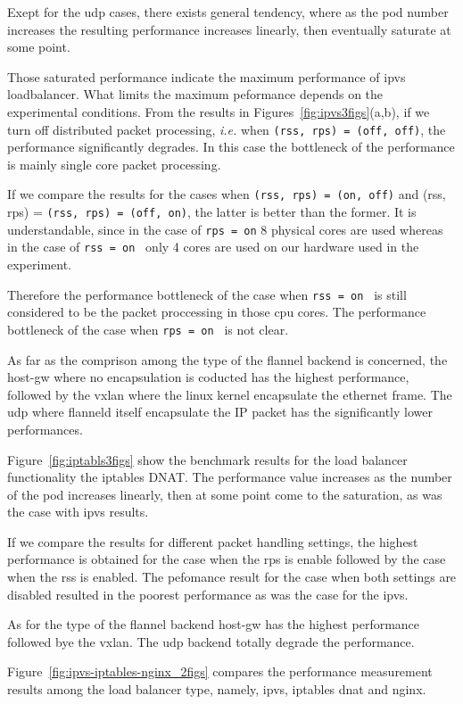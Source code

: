Exept for the udp cases, there exists general tendency, 
where as the pod number increases the resulting performance increases linearly, 
then eventually saturate at some point.

Those saturated performance indicate the maximum performance of ipvs loadbalancer.
What limits the maximum peformance depends on the experimental conditions.
From the results in Figures~\ref{fig:ipvs3figs}(a,b), if we turn off distributed packet processing,
{\it i.e.} when {\tt (rss, rps) = (off, off)}, the performance significantly degrades. 
In this case the bottleneck of the performance is mainly single core packet processing.

If we compare the results for the cases when {\tt (rss, rps) = (on, off)} and (rss, rps) = {\tt (rss, rps) = (off, on)},
the latter is better than the former.
It is understandable, since in the case of {\tt rps = on} 8 physical cores are used whereas 
in the case of {\tt rss = on } only 4 cores are used on our hardware used in the experiment.

Therefore the performance bottleneck of the case when {\tt rss = on } is still 
considered to be the packet proccessing in those cpu cores.
The performance bottleneck of the case when {\tt rps = on } is not clear.

As far as the comprison among the type of the flannel backend is concerned, 
the host-gw where no encapsulation is coducted has the highest performance,
followed by the vxlan where the linux kernel encapsulate the ethernet frame.
The udp where flanneld itself encapsulate the IP packet has the significantly lower performances.

Figure~\ref{fig:iptabls3figs} show the benchmark results for the load balancer 
functionality the iptables DNAT. 
The performance value increases as the number of the pod increases linearly, 
then at some point come to the saturation, as was the case with ipvs results.

If we compare the results for different packet handling settings, the highest performance is 
obtained for the case when the rps is enable followed by the case when the rss is enabled. 
The pefomance result for the case when both settings are disabled resulted in the 
poorest performance as was the case for the ipvs.

As for the type of the flannel backend host-gw has the highest performance followed 
bye the vxlan. The udp backend totally degrade the performance.

Figure~\ref{fig:ipvs-iptables-nginx_2figs} compares the performance measurement results 
among the load balancer type, namely, ipvs, iptables dnat and nginx.

